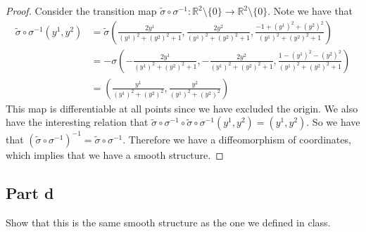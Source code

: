 \documentclass[a4paper]{article}
\begin{document}
\begin{proof}
  Consider the transition map $\tilde{\sigma} \circ \sigma^{-1}: \mathds{R}^2 \setminus \{0\} \rightarrow \mathds{R}^2 \setminus \{0\}$. Note we have that
  \[
    \begin{aligned}
      \tilde{\sigma} \circ \sigma^{-1}(y^1, y^2) &= \tilde{\sigma}\left( \frac{2y^1}{(y^1)^2 + (y^2)^2 + 1}, \frac{2y^2}{(y^1)^2 + (y^2)^2 + 1}, \frac{-1 + (y^1)^2 + (y^2)^2}{(y^1)^2 + (y^2)^2 + 1} \right) \\
                                                 &=-\sigma\left( -\frac{2y^1}{(y^1)^2 + (y^2)^2 + 1}, -\frac{2y^2}{(y^1)^2 + (y^2)^2 + 1}, \frac{1 - (y^1)^2 - (y^2)^2}{(y^1)^2 + (y^2)^2 + 1} \right) \\
                                                 &= \left(\frac{y^1}{(y^1)^2 + (y^2)^2}, \frac{y^2}{(y^1)^2 + (y^2)^2}  \right)
    \end{aligned}
  \]
  This map is differentiable at all points since we have excluded the origin. We also have the interesting relation that $\tilde{\sigma} \circ \sigma^{-1} \circ \tilde{\sigma} \circ \sigma^{-1}(y^1, y^2) = (y^1, y^2)$. So we have that $(\tilde{\sigma} \circ \sigma^{-1})^{-1} = \tilde{\sigma} \circ \sigma^{-1}$. Therefore we have a diffeomorphism of coordinates, which implies that we have a smooth structure.
\end{proof}

\subsection*{Part d}%
\label{sub:Part d}
Show that this is the same smooth structure as the one we defined in class.
\end{document}
